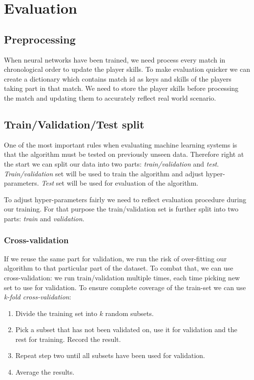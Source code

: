 \documentclass[12pt,a4paper]{book}
\begin{document}
\chapter{Evaluation}
\section{Preprocessing}
When neural networks have been trained, we need process every match in chronological order to update the player skills.
To make evaluation quicker we can create a dictionary which contains match id as keys and skills of the players taking part in that match.
We need to store the player skills before processing the match and updating them to accurately reflect real world scenario.
\section{Train/Validation/Test split}
One of the most important rules when evaluating machine learning systems is that the algorithm must be tested on previously unseen data.
Therefore right at the start we can split our data into two parts: \emph{train/validation} and \emph{test}.
\emph{Train/validation} set will be used to train the algorithm and adjust hyper-parameters.
\emph{Test} set will be used for evaluation of the algorithm.

To adjust hyper-parameters fairly we need to reflect evaluation procedure during our training.
For that purpose the train/validation set is further split into two parts: \emph{train} and \emph{validation}.
\subsection{Cross-validation}
If we reuse the same part for validation, we run the risk of over-fitting our algorithm to that particular part of the dataset.
To combat that, we can use cross-validation: we run train/validation multiple times, each time picking new set to use for validation.
To ensure complete coverage of the train-set we can use \emph{k-fold cross-validation}: 
\begin{enumerate}
\item Divide the training set into $k$ random subsets.
\item Pick a subset that has not been validated on, use it for validation and the rest for training.
Record the result.
\item Repeat step two until all subsets have been used for validation.
\item Average the results.
\end{enumerate}
\end{document}
